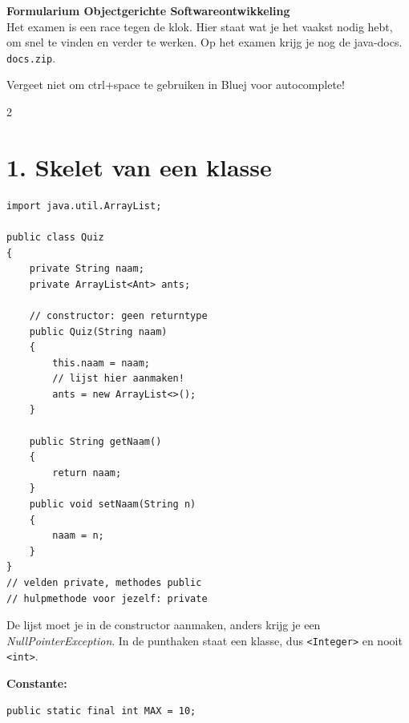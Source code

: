 \documentclass[12pt,a4paper]{extarticle}
\begin{document}
\begin{center}
    {\Large\bfseries Formularium Objectgerichte Softwareontwikkeling}\\[0.5mm]
    {\small Het examen is een race tegen de klok. Hier staat wat je het vaakst nodig
    hebt, om snel te vinden en verder te werken. Op het examen krijg je nog de java-docs.
    \texttt{docs.zip}.}

    Vergeet niet om ctrl+space te gebruiken in Bluej voor autocomplete!
\end{center}
\vspace{1mm}

\begin{multicols}{2}

    \section{1. Skelet van een klasse}
    \begin{lstlisting}
import java.util.ArrayList;

public class Quiz
{
    private String naam;
    private ArrayList<Ant> ants;

    // constructor: geen returntype
    public Quiz(String naam)
    {
        this.naam = naam;
        // lijst hier aanmaken!
        ants = new ArrayList<>();
    }

    public String getNaam()
    {
        return naam;
    }
    public void setNaam(String n)
    {
        naam = n;
    }
}
// velden private, methodes public
// hulpmethode voor jezelf: private
\end{lstlisting}
    De lijst moet je in de constructor aanmaken, anders krijg je een
    \emph{NullPointerException}. In de punthaken staat een klasse, dus
    \texttt{<Integer>} en nooit \texttt{<int>}.

    \textbf{Constante:}
    \begin{lstlisting}
public static final int MAX = 10;
\end{lstlisting}


\end{multicols}
\end{document}
